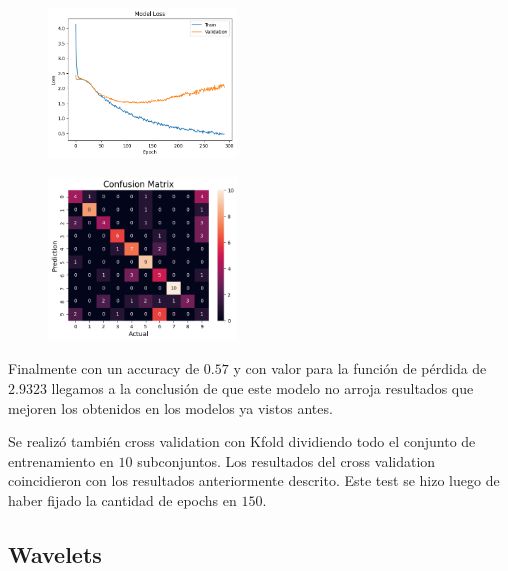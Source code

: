 \documentclass[colorinlistoftodos,twoside,twocolumn,10pt]{article} %
\begin{document}
 \begin{figure}[h!]
	\includegraphics[width=5cm]{vl_loss.png}
\end{figure}


 \begin{figure}[h!]
	\includegraphics[width=5cm]{vl_confussion_matrix.png}
\end{figure}

Finalmente con un accuracy de $0.57$ y con valor para la funci\'on de p\'erdida de  $2.9323$ llegamos a la conclusi\'on de que este modelo no arroja resultados que mejoren los obtenidos en los modelos ya vistos antes.

Se realizó también cross validation con Kfold dividiendo todo el conjunto de entrenamiento en $10$ subconjuntos. Los resultados del cross validation coincidieron con los resultados anteriormente descrito. Este test se hizo luego de haber fijado la cantidad de epochs en $150$.
	\subsection{Wavelets}
\end{document}
